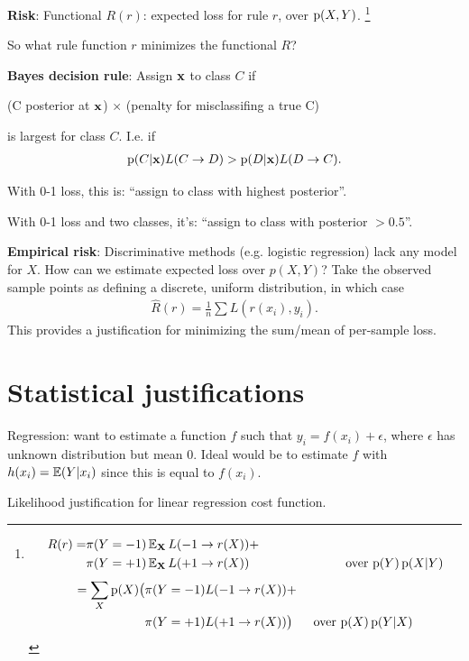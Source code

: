 \documentclass[12pt]{article}
\begin{document}
\textbf{Risk}: Functional $R(r)$: expected loss for rule $r$, over $\operatorname{\text{p}}(X, Y)$.
\footnote{
\begin{align*}
  R(r) = &\pi(Y=-1)\operatorname{\mathbb{E}}_\mathbf X L(-1 \to r(X)) + \\
         &\pi(Y=+1)\operatorname{\mathbb{E}}_\mathbf X L(+1 \to r(X))~~~~~~~~~~~~~~~~~~~~~~~\text{over $\operatorname{\text{p}}(Y)\operatorname{\text{p}}(X|Y)$}
\end{align*}
\begin{align*}
  = \sum_X \operatorname{\text{p}}(X)\big(&\pi(Y=-1)L(-1 \to r(X)) + \\
                     &\pi(Y=+1)L(+1 \to r(X))\big)~~~~~\text{over $\operatorname{\text{p}}(X)\operatorname{\text{p}}(Y|X)$}
\end{align*}
}

So what rule function $r$ minimizes the functional $R$?

\textbf{Bayes decision rule}: Assign $\mathbf x$ to class $C$ if

\begin{center}
(C posterior at $\mathbf x$) $\times$ (penalty for misclassifing a true C)
\end{center}

is largest for class $C$. I.e. if
\begin{align*}
  \operatorname{\text{p}}(C|\mathbf x)L(C \to D) > \operatorname{\text{p}}(D|\mathbf x)L(D \to C).
\end{align*}

With 0-1 loss, this is: ``assign to class with highest posterior''.

With 0-1 loss and two classes, it's: ``assign to class with posterior $> 0.5$''.

\textbf{Empirical risk}: Discriminative methods (e.g. logistic regression) lack
any model for $X$. How can we estimate expected loss over $p(X,Y)$? Take the
observed sample points as defining a discrete, uniform distribution, in which
case
\begin{align*}
  \hat R(r) = \frac{1}{n}\sum L(r(x_i), y_i).
\end{align*}
This provides a justification for minimizing the sum/mean of per-sample loss.

\newpage
\section*{Statistical justifications}

Regression: want to estimate a function $f$ such that
$y_i = f(x_i) + \epsilon$, where $\epsilon$ has unknown distribution but mean
0. Ideal would be to estimate $f$ with $h(x_i) = \operatorname{\mathbb{E}}(Y|x_i)$ since this is equal
to $f(x_i)$.

Likelihood justification for linear regression cost function.
\end{document}
